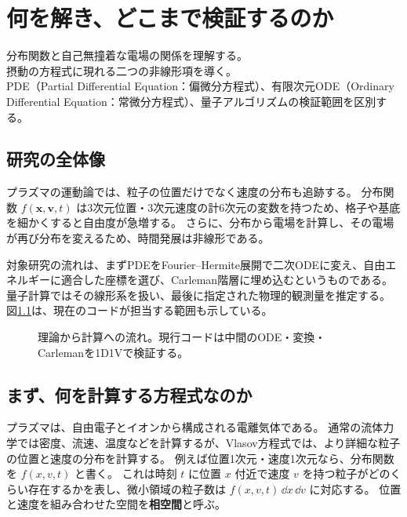 \chapter{何を解き、どこまで検証するのか}
\begin{chaptergoal}
\cgitem 分布関数と自己無撞着な電場の関係を理解する。\\
\cgitem 摂動の方程式に現れる二つの非線形項を導く。\\
\cgitem PDE（Partial Differential Equation：偏微分方程式）、有限次元ODE（Ordinary Differential Equation：常微分方程式）、量子アルゴリズムの検証範囲を区別する。
\end{chaptergoal}

\section{研究の全体像}
プラズマの運動論では、粒子の位置だけでなく速度の分布も追跡する。
分布関数 $f(\bm x,\bm v,t)$ は3次元位置・3次元速度の計6次元の変数を持つため、格子や基底を細かくすると自由度が急増する。
さらに、分布から電場を計算し、その電場が再び分布を変えるため、時間発展は非線形である。

対象研究の流れは、まずPDEをFourier--Hermite展開で二次ODEに変え、自由エネルギーに適合した座標を選び、Carleman階層に埋め込むというものである。
量子計算ではその線形系を扱い、最後に指定された物理的観測量を推定する。
図\ref{fig:workflow}は、現在のコードが担当する範囲も示している。
\begin{figure}[htbp]
\centering
{}
\caption{理論から計算への流れ。現行コードは中間のODE・変換・Carlemanを1D1Vで検証する。}
\label{fig:workflow}
\end{figure}

\section{まず、何を計算する方程式なのか}
プラズマは、自由電子とイオンから構成される電離気体である。
通常の流体力学では密度、流速、温度などを計算するが、Vlasov方程式では、より詳細な粒子の位置と速度の分布を計算する。
例えば位置1次元・速度1次元なら、分布関数を $f(x,v,t)$ と書く。
これは時刻 $t$ に位置 $x$ 付近で速度 $v$ を持つ粒子がどのくらい存在するかを表し、微小領域の粒子数は $f(x,v,t)\,\dd x\,\dd v$ に対応する。
位置と速度を組み合わせた空間を\textbf{相空間}と呼ぶ。

